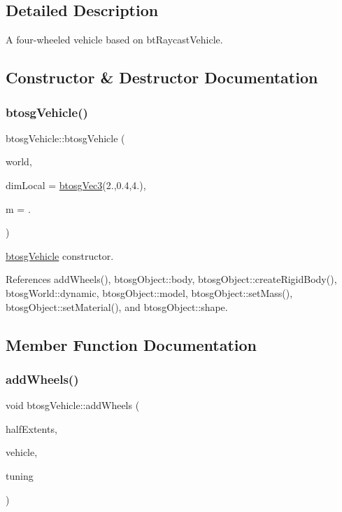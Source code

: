 \subsection{Detailed Description}
A four-\/wheeled vehicle based on bt\+Raycast\+Vehicle. 

\subsection{Constructor \& Destructor Documentation}
\mbox{\label{classbtosgVehicle_aa754dd94553b8690763e4c24d1f26227}} 
\subsubsection{\texorpdfstring{btosg\+Vehicle()}{btosgVehicle()}}
{\footnotesize\ttfamily btosg\+Vehicle\+::btosg\+Vehicle (\begin{DoxyParamCaption}\item[{\hyperlink{classbtosgWorld}{btosg\+World} $\ast$}]{world,  }\item[{\hyperlink{classbtosgVec3}{btosg\+Vec3}}]{dim\+Local = {\ttfamily \hyperlink{classbtosgVec3}{btosg\+Vec3}(2.,0.4,4.)},  }\item[{double}]{m = {.} }\end{DoxyParamCaption})\hspace{0.3cm}{\ttfamily [inline]}}

\hyperlink{classbtosgVehicle}{btosg\+Vehicle} constructor. 

References add\+Wheels(), btosg\+Object\+::body, btosg\+Object\+::create\+Rigid\+Body(), btosg\+World\+::dynamic, btosg\+Object\+::model, btosg\+Object\+::set\+Mass(), btosg\+Object\+::set\+Material(), and btosg\+Object\+::shape.



\subsection{Member Function Documentation}
\mbox{\label{classbtosgVehicle_a98971fb952c08cb72341a0c333fc66de}} 
\subsubsection{\texorpdfstring{add\+Wheels()}{addWheels()}}
{\footnotesize\ttfamily void btosg\+Vehicle\+::add\+Wheels (\begin{DoxyParamCaption}\item[{bt\+Vector3 $\ast$}]{half\+Extents,  }\item[{bt\+Raycast\+Vehicle $\ast$}]{vehicle,  }\item[{bt\+Raycast\+Vehicle\+::bt\+Vehicle\+Tuning}]{tuning }\end{DoxyParamCaption})\hspace{0.3cm}{\ttfamily [inline]}}


